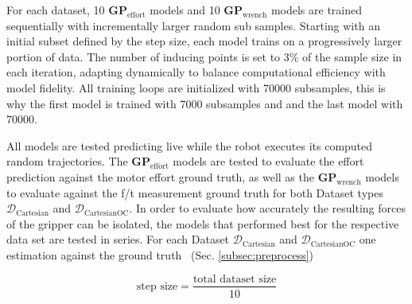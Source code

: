     For each dataset, 10 \(\boldsymbol{GP}_{\text{effort}}\) models and 10 \(\boldsymbol{GP}_{\text{wrench}}\) models are trained sequentially with incrementally larger random sub samples. Starting with an initial subset defined by the step size, each model trains on a progressively larger portion of data. The number of inducing points is set to 3\% of the sample size in each iteration, adapting dynamically to balance computational efficiency with model fidelity. All training loops are initialized with 70000 subsamples, this is why the first model is trained with 7000 subsamples and and the last model with 70000.

    All models are tested predicting live while the robot executes its computed random trajectories. The \(\boldsymbol{GP}_{\text{effort}}\) models are tested to evaluate the effort prediction against the motor effort ground truth, as well as the \(\boldsymbol{GP}_{\text{wrench}}\) models to evaluate against the f/t measurement ground truth for both Dataset types \(\mathcal{D}_{\text{Cartesian}}\) and \(\mathcal{D}_{\text{CartesianOC}}\). In order to evaluate how accurately the resulting forces of the gripper can be isolated, the models that performed best for the respective data set are tested in series. For each Dataset \(\mathcal{D}_{\text{Cartesian}}\) and \(\mathcal{D}_{\text{CartesianOC}}\) one estimation against the ground truth ~(Sec. \ref{subsec:preprocess}) 
    
    \begin{equation}
    \text{step size} = \frac{\text{total dataset size}}{10}
    \label{eq:step_size}
    \end{equation}